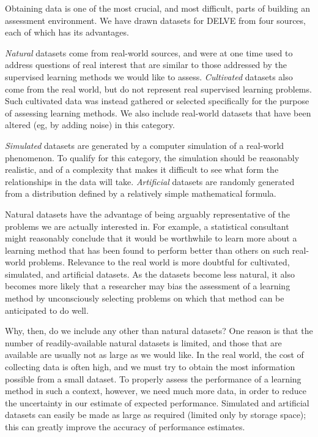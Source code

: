 Obtaining data is one of the most crucial, and most difficult, parts
of building an assessment environment.  We have drawn datasets for
DELVE from four sources, each of which has its advantages.

\emph{Natural} datasets come from real-world sources, and were at one
time used to address questions of real interest that are similar to
those addressed by the supervised learning methods we would like to
assess.  \emph{Cultivated} datasets also come from the real world, but
do not represent real supervised learning problems.  Such cultivated
data was instead gathered or selected specifically for the purpose of
assessing learning methods.  We also include real-world datasets that
have been altered (eg, by adding noise) in this category.

\emph{Simulated} datasets are generated by a computer simulation of a
real-world phenomenon.  To qualify for this category, the simulation
should be reasonably realistic, and of a complexity that makes it
difficult to see what form the relationships in the data will take.
\emph{Artificial} datasets are randomly generated from a distribution
defined by a relatively simple mathematical formula.

Natural datasets have the advantage of being arguably representative
of the problems we are actually interested in.  For example, a
statistical consultant might reasonably conclude that it would be
worthwhile to learn more about a learning method that has been found
to perform better than others on such real-world problems.  Relevance
to the real world is more doubtful for cultivated, simulated, and
artificial datasets.  As the datasets become less natural, it also
becomes more likely that a researcher may bias the assessment of a
learning method by unconsciously selecting problems on which that
method can be anticipated to do well.

Why, then, do we include any other than natural datasets?  One reason
is that the number of readily-available natural datasets is limited,
and those that are available are usually not as large as we would
like.  In the real world, the cost of collecting data is often high,
and we must try to obtain the most information possible from a small
dataset.  To properly assess the performance of a learning method in
such a context, however, we need much more data, in order to reduce
the uncertainty in our estimate of expected performance.  Simulated
and artificial datasets can easily be made as large as required
(limited only by storage space); this can greatly improve the accuracy
of performance estimates.


